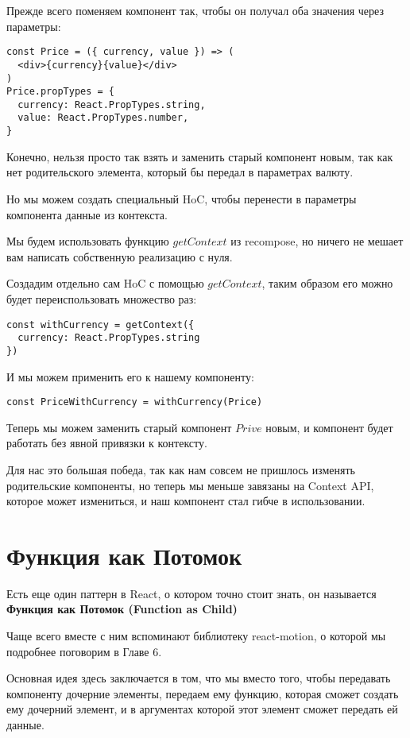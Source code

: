Прежде всего поменяем компонент так, чтобы он получал оба значения через параметры:

\begin{lstlisting}
const Price = ({ currency, value }) => (
  <div>{currency}{value}</div>
)
Price.propTypes = {
  currency: React.PropTypes.string,
  value: React.PropTypes.number,
}
\end{lstlisting}

Конечно, нельзя просто так взять и заменить старый компонент новым, так как нет родительского элемента, который бы передал в параметрах валюту.

Но мы можем создать специальный HoC, чтобы перенести в параметры компонента данные из контекста.

Мы будем использовать функцию $getContext$ из recompose, но ничего не мешает вам написать собственную реализацию с нуля.

Создадим отдельно сам HoC с помощью $getContext$, таким образом его можно будет переиспользовать множество раз: 

\begin{lstlisting}
const withCurrency = getContext({
  currency: React.PropTypes.string
})
\end{lstlisting}

И мы можем применить его к нашему компоненту:

\begin{lstlisting}
const PriceWithCurrency = withCurrency(Price)
\end{lstlisting}

Теперь мы можем заменить старый компонент $Prive$ новым, и компонент будет работать без явной привязки к контексту.

Для нас это большая победа, так как нам совсем не пришлось изменять родительские компоненты, но теперь мы меньше завязаны на Context API, которое может измениться, и наш компонент стал гибче в использовании.


\section{Функция как Потомок}

Есть еще один паттерн в React, о котором точно стоит знать, он называется \textbf{Функция как Потомок (Function as Child)}

Чаще всего вместе с ним вспоминают библиотеку react-motion, о которой мы подробнее поговорим в Главе 6.

Основная идея здесь заключается в том, что мы вместо того, чтобы передавать компоненту дочерние элементы, передаем ему функцию, которая сможет создать ему дочерний элемент, и в аргументах которой этот элемент сможет передать ей данные.

